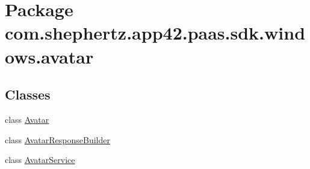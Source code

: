 \hypertarget{namespacecom_1_1shephertz_1_1app42_1_1paas_1_1sdk_1_1windows_1_1avatar}{\section{Package com.\+shephertz.\+app42.\+paas.\+sdk.\+windows.\+avatar}
\label{namespacecom_1_1shephertz_1_1app42_1_1paas_1_1sdk_1_1windows_1_1avatar}
}
\subsection*{Classes}
\begin{DoxyCompactItemize}
\item 
class \hyperlink{classcom_1_1shephertz_1_1app42_1_1paas_1_1sdk_1_1windows_1_1avatar_1_1_avatar}{Avatar}
\item 
class \hyperlink{classcom_1_1shephertz_1_1app42_1_1paas_1_1sdk_1_1windows_1_1avatar_1_1_avatar_response_builder}{Avatar\+Response\+Builder}
\item 
class \hyperlink{classcom_1_1shephertz_1_1app42_1_1paas_1_1sdk_1_1windows_1_1avatar_1_1_avatar_service}{Avatar\+Service}
\end{DoxyCompactItemize}
